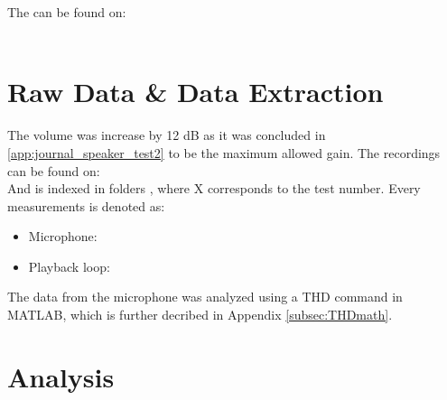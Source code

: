 The  can be found on:\\
\\

\section{Raw Data \& Data Extraction}
The volume was increase by 12 dB as it was concluded in \autoref{app:journal_speaker_test2} to be the maximum allowed gain.
The recordings can be found on:\\
And is indexed in folders , where X corresponds to the test number. Every measurements is denoted as:
\vspace*{-5mm}
\begin{itemize}\addtolength{\itemsep}{-.35\baselineskip} 
\item Microphone: 
\item Playback loop: 
\end{itemize}
The data from the microphone was analyzed using a THD command in MATLAB, which is further decribed in Appendix \ref{subsec:THDmath}. 

%
%    
%    
%

\section{Analysis}

